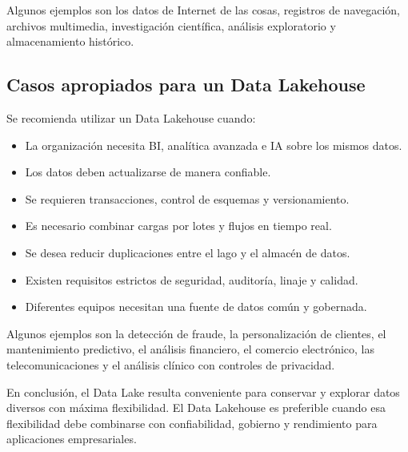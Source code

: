 Algunos ejemplos son los datos de Internet de las cosas, registros de
navegación, archivos multimedia, investigación científica, análisis
exploratorio y almacenamiento histórico.

\subsection*{Casos apropiados para un Data Lakehouse}

Se recomienda utilizar un Data Lakehouse cuando:

\begin{itemize}
    \item La organización necesita BI, analítica avanzada e IA sobre los mismos datos.
    \item Los datos deben actualizarse de manera confiable.
    \item Se requieren transacciones, control de esquemas y versionamiento.
    \item Es necesario combinar cargas por lotes y flujos en tiempo real.
    \item Se desea reducir duplicaciones entre el lago y el almacén de datos.
    \item Existen requisitos estrictos de seguridad, auditoría, linaje y calidad.
    \item Diferentes equipos necesitan una fuente de datos común y gobernada.
\end{itemize}

Algunos ejemplos son la detección de fraude, la personalización de clientes, el
mantenimiento predictivo, el análisis financiero, el comercio electrónico, las
telecomunicaciones y el análisis clínico con controles de privacidad.

En conclusión, el Data Lake resulta conveniente para conservar y explorar datos
diversos con máxima flexibilidad. El Data Lakehouse es preferible cuando esa
flexibilidad debe combinarse con confiabilidad, gobierno y rendimiento para
aplicaciones empresariales.
